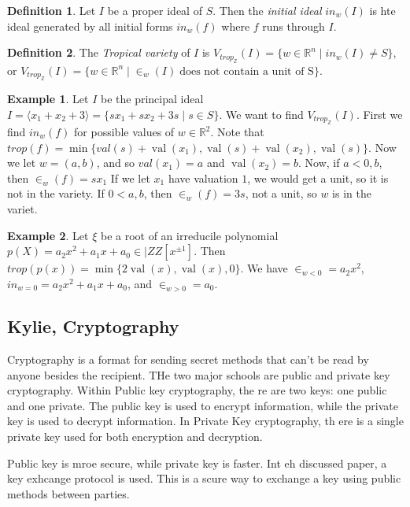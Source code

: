 \documentclass[11pt]{article}
\theoremstyle{definition}
\newtheorem{protoexample}{Example}[section]
\newenvironment{ex}
   {\begin{protoexample}}
   {\end{protoexample}}
\newtheorem{protodefinition}{Definition}[section]
\newenvironment{define}
   {\begin{protodefinition}}
   {\end{protodefinition}}
\def\ZZ{{\mathbb Z}}
\def\RR{{\mathbb R}}
\DeclareMathOperator{\val}{val}
\begin{document}
\begin{define}
    Let $I$ be a proper ideal of $S$.  Then the \emph{initial ideal} $in_w(I)$ is hte ideal generated by all initial forms $in_w(f)$ where $f$ runs through $I$.
\end{define}


\begin{define}
The \emph{Tropical variety} of $I$ is $V_{trop_\ZZ}(I) = \{w \in \RR^n\; |\; in_w(I) \neq S\}$, or $V_{trop_\ZZ}(I) = \{ w \in \RR^n \; |\; \in_w(I) \; \text{does not contain a unit of S}\}$.
\end{define}



\begin{ex}
Let $I$ be the principal ideal $I = \langle x_1 +x_2 + 3\rangle= \{sx_1+sx_2+3s\; |\; s\in S\}$. We want to find $V_{trop_\ZZ}(I)$. First we find $in_w(f)$ for possible values of $w\in \RR^2$. Note that $trop(f)= \min\{val(s) + \val(x_1), \val(s) + \val(x_2), \val(s)\}$. Now we let $w=(a,b)$, and so $val(x_1)=a$ and $\val(x_2)=b$. Now, if $a<0,b$, then $\in_w(f) = sx_1$ If we let $x_1$ have valuation $1$, we would get a unit, so it is not in the variety. If $0<a,b$, then $\in_w(f)=3s$, not a unit, so $w$ is in the variet.
\end{ex}


\begin{ex}
Let $\xi$ be a root of an irreducile polynomial $p(X) =a_2x^2+a_1x+a_0\in |ZZ[x^{\pm1}]$. Then $trop(p(x)) = \min\{2\val(x), \val(x), 0\}$. We have $\in_{w<0}=a_2x^2$, $in_{w =0} = a_2x^2+a_1x+a_0$, and $\in_{w>0} =a_0$.
\end{ex}




\subsection{Kylie, Cryptography}

Cryptography is a format for sending secret methods that can't be read by anyone besides the recipient. THe two major schools are public and private key cryptography. Within Public key cryptography, the re are two keys: one public and one private. The public key is used to encrypt information, while the private key is used to decrypt information. In Private Key cryptography, th ere is a single private key used for both encryption and decryption.

Public key is mroe secure, while private key is faster. Int eh discussed paper, a key exhcange protocol is used. This is a scure way to exchange a key using public methods between parties.
\end{document}
